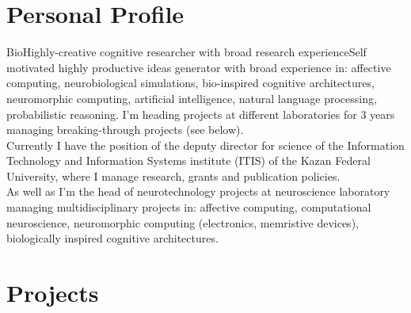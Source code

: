 \documentclass{moderncv}
\begin{document}
%
\makecvtitle

 
\section{Personal Profile}

\cventry
    {Bio}{Highly-creative cognitive researcher with broad research experience}{}{}{}{Self motivated highly productive ideas generator with broad experience in: affective computing, neurobiological simulations, bio-inspired cognitive architectures, neuromorphic computing, artificial intelligence, natural language processing, probabilistic reasoning. I'm heading projects at different laboratories for 3 years managing breaking-through projects (see below).\\
      Currently I have the position of the deputy director for science of the Information Technology and Information Systems institute (ITIS) of the Kazan Federal University, where I manage research, grants and publication policies.\\
      As well as I'm the head of neurotechnology projects at neuroscience laboratory managing multidisciplinary projects in: affective computing, computational neuroscience, neuromorphic computing (electronics, memristive devices), biologically inspired cognitive architectures.}


\section{Projects}
\end{document}
